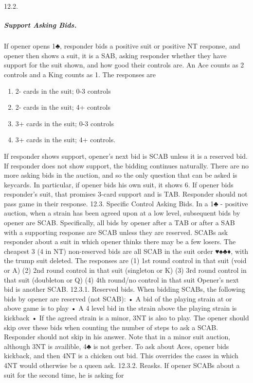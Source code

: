 \documentclass[10pt]{article}
\begin{document}
\begin{multicols*}{2}
12.2.
\subparagraph{Support Asking Bids.}

If opener opens 1♣, responder bids a positive suit or
positive NT response, and opener then shows a suit, it is a SAB, asking responder
whether they have support for the suit shown, and how good their controls are. An
Ace counts as 2 controls and a King counts as 1. The responses are
\begin{enumerate}
\item 2- cards in the suit; 0-3 controls
\item 2- cards in the suit; 4+ controls
\item 3+ cards in the suit; 0-3 controls
\item 3+ cards in the suit; 4+ controls.
\end{enumerate}
If responder shows support, opener’s next bid is SCAB unless it is a reserved
bid.
If responder does not show support, the bidding continues naturally. There are
no more asking bids in the auction, and so the only question that can be asked
is keycards. In particular, if opener bids his own suit, it shows 6. If opener bids
responder’s suit, that promises 3-card support and is TAB. Responder should not
pass game in their response.
12.3. Specific Control Asking Bids. In a 1♣ - positive auction, when a strain
has been agreed upon at a low level, subsequent bids by opener are SCAB. Specifically, all bids by opener after a TAB or after a SAB with a supporting response
are SCAB unless they are reserved. SCABs ask responder about a suit in which
opener thinks there may be a few losers.
The cheapest 3 (4 in NT) non-reserved bids are all SCAB in the suit order
♥♠♣♦, with the trump suit deleted. The responses are
(1) 1st round control in that suit (void or A)
(2) 2nd round control in that suit (singleton or K)
(3) 3rd round control in that suit (doubleton or Q)
(4) 4th round/no control in that suit
Opener’s next bid is another SCAB.
12.3.1. Reserved bids. When bidding SCABs, the following bids by opener are reserved (not SCAB):
• A bid of the playing strain at or above game is to play
• A 4 level bid in the strain above the playing strain is kickback
• If the agreed strain is a minor, 3NT is also to play.
The opener should skip over these bids when counting the number of steps to ask
a SCAB. Responder should not skip in his answer.
Note that in a minor suit auction, although 3NT is availible, 4♣ is not gerber.
To ask about Aces, opener bids kickback, and then 4NT is a chicken out bid. This
overrides the cases in which 4NT would otherwise be a queen ask.
12.3.2. Reasks. If opener SCABs about a suit for the second time, he is asking for

\end{multicols*}
\end{document}
